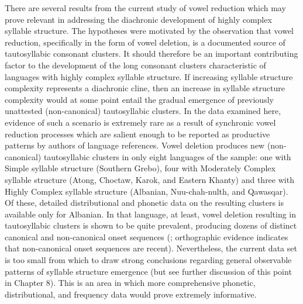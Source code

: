   There are several results from the current study of vowel reduction which may prove relevant in addressing the diachronic development of highly complex syllable structure. The hypotheses were motivated by the observation that vowel reduction, specifically in the form of vowel deletion, is a documented source of tautosyllabic consonant clusters. It should therefore be an important contributing factor to the development of the long consonant clusters characteristic of languages with highly complex syllable structure. If increasing syllable structure complexity represents a diachronic cline, then an increase in syllable structure complexity would at some point entail the gradual emergence of previously unattested (non-canonical) tautosyllabic clusters. In the data examined here, evidence of such a scenario is extremely rare as a result of synchronic vowel reduction processes which are salient enough to be reported as productive patterns by authors of language references. Vowel deletion produces new (non-canonical) tautosyllabic clusters in only eight languages of the sample: one with Simple syllable structure (Southern Grebo), four with Moderately Complex syllable structure (Atong, Choctaw, Karok, and Eastern Khanty) and three with Highly Complex syllable structure (Albanian, Nuu-chah-nulth, and Qawasqar). Of these, detailed distributional and phonetic data on the resulting clusters is available only for Albanian. In that language, at least, vowel deletion resulting in tautosyllabic clusters is shown to be quite prevalent, producing dozens of distinct canonical and non-canonical onset sequences (\citealt{Klippenstein2010}; orthographic evidence indicates that non-canonical onset sequences are recent). Nevertheless, the current data set is too small from which to draw strong conclusions regarding general observable patterns of syllable structure emergence (but see further discussion of this point in Chapter 8). This is an area in which more comprehensive phonetic, distributional, and frequency data would prove extremely informative.




